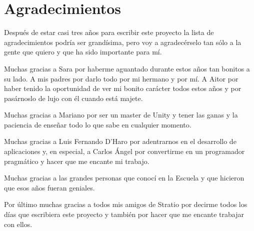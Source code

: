 \cleardoublepage
{}
\chapter*{Agradecimientos}

Después de estar casi tres años para escribir este proyecto la lista de agradecimientos podría ser grandísima, pero voy a agradecérselo tan sólo a la gente que quiero y que ha sido importante para mí.

Muchas gracias a Sara por haberme aguantado durante estos años tan bonitos a su lado. A mis padres por darlo todo por mi hermano y por mí. A Aitor por haber tenido la oportunidad de ver mi bonito carácter todos estos años y por pasárnoslo de lujo con él cuando está majete.

Muchas gracias a Mariano por ser un master de Unity y tener las ganas y la paciencia de enseñar todo lo que sabe en cualquier momento.

Muchas gracias a Luis Fernando D'Haro por adentrarnos en el desarrollo de aplicaciones y, en especial, a Carlos Ángel por convertirme en un programador pragmático y hacer que me encante mi trabajo. 

Muchas gracias a las grandes personas que conocí en la Escuela y que hicieron que esos años fueran geniales.

Por último muchas gracias a todos mis amigos de Stratio por decirme todos los días que escribiera este proyecto y también por hacer que me encante trabajar con ellos.